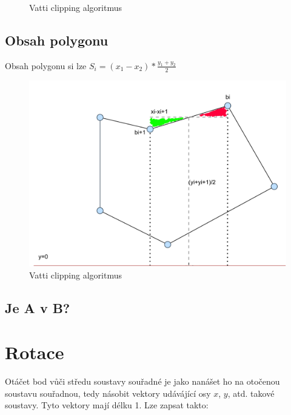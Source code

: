 \documentclass[a4paper,12pt]{book}
\begin{document}



\begin{figure}[H]
  \centering
  
  \caption{Vatti clipping algoritmus}
\end{figure}



\section{Obsah polygonu}

Obsah polygonu si lze
$S_i = (x_1-x_2)*\frac{y_1+y_2}{2}$

\begin{figure}[H]
  \centering
  \includegraphics[width=1\textwidth]{fig8.png}
  \caption{Vatti clipping algoritmus}
\end{figure}


\section{Je A v B?}




\chapter{Rotace}


Otáčet bod vůči středu soustavy souřadné je jako nanášet ho na otočenou soustavu souřadnou, tedy násobit vektory udávájící osy $x$, $y$, atd. takové soustavy.
Tyto vektory mají délku 1. Lze zapsat takto:
\end{document}
